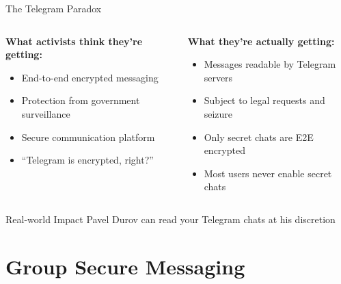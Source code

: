 \documentclass[aspectratio=169, lualatex, handout]{beamer}
\begin{document}
\begin{frame}{The Telegram Paradox}
	\begin{columns}[c]
		\begin{column}{0.5\textwidth}
			\textbf{What activists think they're getting:}
			\begin{itemize}
				\item End-to-end encrypted messaging
				\item Protection from government surveillance
				\item Secure communication platform
				\item ``Telegram is encrypted, right?''
			\end{itemize}
		\end{column}
		\begin{column}{0.5\textwidth}
			\textbf{What they're actually getting:}
			\begin{itemize}
				\item Messages readable by Telegram servers
				\item Subject to legal requests and seizure
				\item Only secret chats are E2E encrypted
				\item Most users never enable secret chats
			\end{itemize}
		\end{column}
	\end{columns}
	\begin{alertblock}{Real-world Impact}
		Pavel Durov can read your Telegram chats at his discretion
	\end{alertblock}
\end{frame}

\section{Group Secure Messaging}
\end{document}
